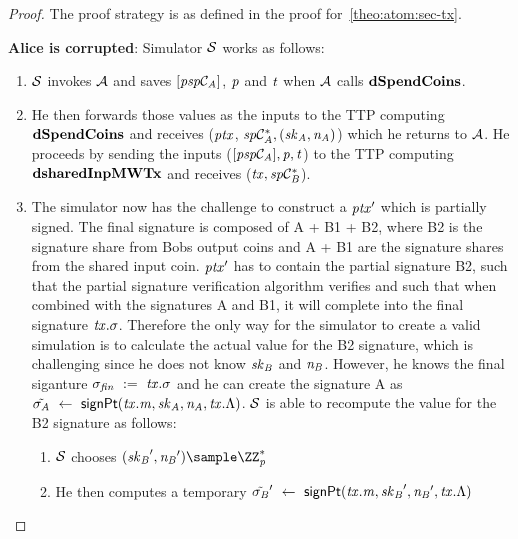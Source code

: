 \begin{proof}
    The proof strategy is as defined in the proof for~\cref{theo:atom:sec-tx}.

    \textbf{Alice is corrupted}: Simulator $\mathcal{S}$ works as follows:
    \begin{enumerate}
        \item $\mathcal{S}$ invokes $\mathcal{A}$ and saves $[\mathit{psp}\mathcal{C}_{\mathit{A}}]$, $\mathit{p}$ and $\mathit{t}$ when $\mathcal{A}$ calls $\mathbf{dSpendCoins}$.
        \item He then forwards those values as the inputs to the TTP computing $\mathbf{dSpendCoins}$ and receives ($\mathit{ptx}$, $\mathit{sp}\mathcal{C}_{\mathit{A}}^*, (\mathit{sk}_{\mathit{A}}, \mathit{\mathit{n}_{\mathit{A}}})$) which he returns to $\mathcal{A}$.
        He proceeds by sending the inputs ($[\mathit{psp}\mathcal{C}_{\mathit{A}}], \mathit{p}, \mathit{t}$) to the TTP computing $\mathbf{dsharedInpMWTx}$ and receives ($\mathit{tx}, \mathit{sp}\mathcal{C}_{\mathit{B}}^*$).
        \item The simulator now has the challenge to construct a ${\mathit{ptx}}'$ which is partially signed.
        The final signature is composed of A + B1 + B2, where B2 is the signature share from Bobs output coins and A + B1 are the signature shares from the shared input coin.
        ${\mathit{ptx}}'$ has to contain the partial signature B2, such that the partial signature verification algorithm verifies and such that when combined with the signatures A and B1, it will complete into the final signature $\mathit{tx}.\sigma$.
        Therefore the only way for the simulator to create a valid simulation is to calculate the actual value for the B2 signature, which is challenging since he does not know $\mathit{sk}_{\mathit{B}}$ and $\mathit{\mathit{n}_{\mathit{B}}}$.
        However, he knows the final siganture $\sigma_{\mathit{fin}} ~:=~ \mathit{tx}.\sigma$ and he can create the signature A as $\tilde{\sigma_{\mathit{A}}} ~\leftarrow~ \mathsf{signPt}(\mathit{tx}.\mathit{m}, \mathit{sk}_{\mathit{A}}, \mathit{\mathit{n}_{\mathit{A}}}, \mathit{tx}.\Lambda)$.
        $\mathcal{S}$ is able to recompute the value for the B2 signature as follows:
        \begin{enumerate}
            \item $\mathcal{S}$ chooses $(\funStarAlt{\varSecKeyBob}, \funStarAlt{\varNonceBob}) \sample \cnstIntegersPrimeWithoutZero{\varPrime}$
            \item He then computes a temporary ${\tilde{\sigma_{\mathit{B}}}}' ~\leftarrow~ \mathsf{signPt}(\mathit{tx}.\mathit{m}, {\mathit{sk}_{\mathit{B}}}', {\mathit{\mathit{n}_{\mathit{B}}}}', \mathit{tx}.\Lambda)$

\end{enumerate}
\end{enumerate}
\end{proof}
